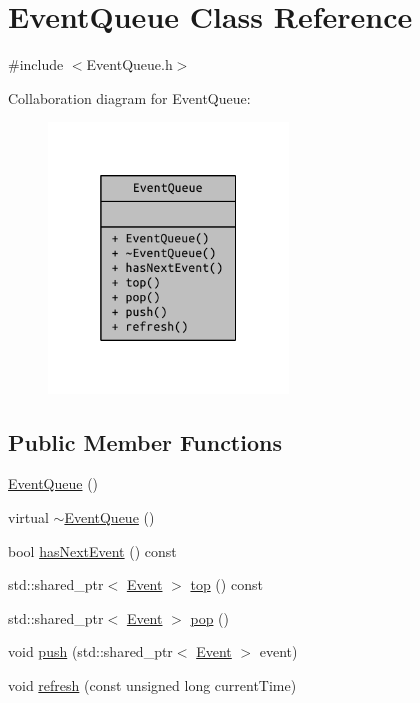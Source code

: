 \hypertarget{class_event_queue}{}\section{Event\+Queue Class Reference}
\label{class_event_queue}


{\ttfamily \#include $<$Event\+Queue.\+h$>$}



Collaboration diagram for Event\+Queue\+:
\nopagebreak
\begin{figure}[H]
\begin{center}
\leavevmode
\includegraphics[width=181pt]{class_event_queue__coll__graph}
\end{center}
\end{figure}
\subsection*{Public Member Functions}
\begin{DoxyCompactItemize}
\item 
\hyperlink{class_event_queue_ab7de5a41befc94aac0f461391e67f14a}{Event\+Queue} ()
\item 
virtual \hyperlink{class_event_queue_ac57db8e2366f2c6c594e6afc975e3b59}{$\sim$\+Event\+Queue} ()
\item 
bool \hyperlink{class_event_queue_ad439103ef84d177e2cd37eab36bbb606}{has\+Next\+Event} () const 
\item 
std\+::shared\+\_\+ptr$<$ \hyperlink{class_event}{Event} $>$ \hyperlink{class_event_queue_af633f824cb4f4c3ff99d8e0601b61ce6}{top} () const 
\item 
std\+::shared\+\_\+ptr$<$ \hyperlink{class_event}{Event} $>$ \hyperlink{class_event_queue_a63042846b35c5071f876ceecbfe56ade}{pop} ()
\item 
void \hyperlink{class_event_queue_a826f8fd05053a782f45c568feb76dbd7}{push} (std\+::shared\+\_\+ptr$<$ \hyperlink{class_event}{Event} $>$ event)
\item 
void \hyperlink{class_event_queue_a0a9d0f11be898266a61bbd8d569369a5}{refresh} (const unsigned long current\+Time)
\end{DoxyCompactItemize}


